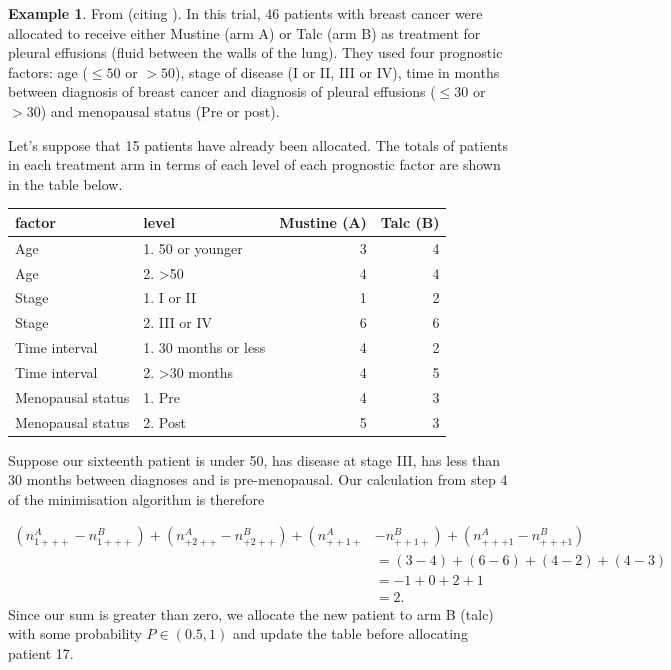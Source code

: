 \documentclass[
  openany]{book}
\theoremstyle{definition}
\theoremstyle{definition}
\newtheorem{example}{Example}[chapter]
\theoremstyle{definition}
\theoremstyle{definition}
\theoremstyle{remark}
\begin{document}
\begin{example}
From \citet{altman1990practical} (citing \citet{fentiman1983control}).
In this trial, 46 patients with breast cancer were allocated to receive either Mustine (arm A) or Talc (arm B) as treatment for pleural effusions (fluid between the walls of the lung). They used four prognostic factors: age (\(\leq{50}\) or \(>50\)), stage of disease (I or II, III or IV), time in months between diagnosis of breast cancer and diagnosis of pleural effusions (\(\leq{30}\) or \(>30\)) and menopausal status (Pre or post).

Let's suppose that 15 patients have already been allocated. The totals of patients in each treatment arm in terms of each level of each prognostic factor are shown in the table below.

\begin{tabular}{l|l|r|r}
\hline
factor & level & Mustine (A) & Talc (B)\\
\hline
Age & 1. 50 or younger & 3 & 4\\
\hline
Age & 2. >50 & 4 & 4\\
\hline
Stage & 1. I or II & 1 & 2\\
\hline
Stage & 2. III or IV & 6 & 6\\
\hline
Time interval & 1. 30 months or less & 4 & 2\\
\hline
Time interval & 2. >30 months & 4 & 5\\
\hline
Menopausal status & 1. Pre & 4 & 3\\
\hline
Menopausal status & 2. Post & 5 & 3\\
\hline
\end{tabular}

Suppose our sixteenth patient is under 50, has disease at stage III, has less than 30 months between diagnoses and is pre-menopausal.
Our calculation from step 4 of the minimisation algorithm is therefore

\[
\begin{aligned}
\left(n^A_{1+++} - n^B_{1+++}\right) + \left(n^A_{+2++} - n^B_{+2++}\right) + \left(n^A_{++1+} \right.& \left.- n^B_{++1+}\right) + \left(n^A_{+++1} - n^B_{+++1}\right) \\
& = \left(3-4\right) + \left(6-6\right) + \left(4-2\right) + \left(4-3\right) \\
& = -1 + 0 + 2 + 1\\
& = 2 .
\end{aligned}
\]
Since our sum is greater than zero, we allocate the new patient to arm B (talc) with some probability \(P\in\left(0.5,1\right)\) and update the table before allocating patient 17.
\end{example}
\end{document}
